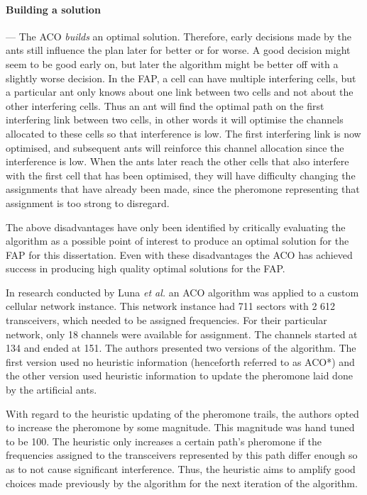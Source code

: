 \paragraph{Building a solution}
--- The \gls{ACO} \emph{builds} an optimal solution. Therefore, early decisions made by the ants still influence the plan later for better or for worse. A good decision might seem to be good early on, but later the algorithm might be better off with a slightly worse decision. In the \gls{FAP}, a cell can have multiple interfering cells, but a particular ant only knows about one link between two cells and not about the other interfering cells. Thus an ant will find the optimal path on the first interfering link between two cells, in other words it will optimise the channels allocated to these cells so that interference is low. The first interfering link is now optimised, and subsequent ants will reinforce this channel allocation since the interference is low. When the ants later reach the other cells that also interfere with the first cell that has been optimised, they will have difficulty changing the assignments that have already been made, since the pheromone representing that assignment is too strong to disregard.

The above disadvantages have only been identified by critically evaluating the algorithm as a possible point of interest to produce an optimal solution for the \gls{FAP} for this dissertation. Even with these disadvantages the \gls{ACO} has achieved success in producing high quality optimal solutions for the \gls{FAP}.

In research conducted by Luna \emph{et al.}\cite{ACOvsEA} an \gls{ACO} algorithm was applied to a custom cellular network instance. This network instance had 711 sectors with 2 612 transceivers, which needed to be assigned frequencies. For their particular network, only 18 channels were available for assignment. The channels started at 134 and ended at 151\cite{ACOvsEA}.
The authors presented two versions of the algorithm. The first version used no heuristic information (henceforth referred to as \gls{ACO}*) and the other version used heuristic information to update the pheromone laid done by the artificial ants\cite{ACOvsEA}.

With regard to the heuristic updating of the pheromone trails, the authors opted to increase the pheromone by some magnitude\cite{ACOvsEA}. This magnitude was hand tuned to be 100. The heuristic only increases a certain path's pheromone if the frequencies assigned to the transceivers represented by this path differ enough so as to not cause significant interference\cite{ACOvsEA}. Thus, the heuristic aims to amplify good choices made previously by the algorithm for the next iteration of the algorithm.

